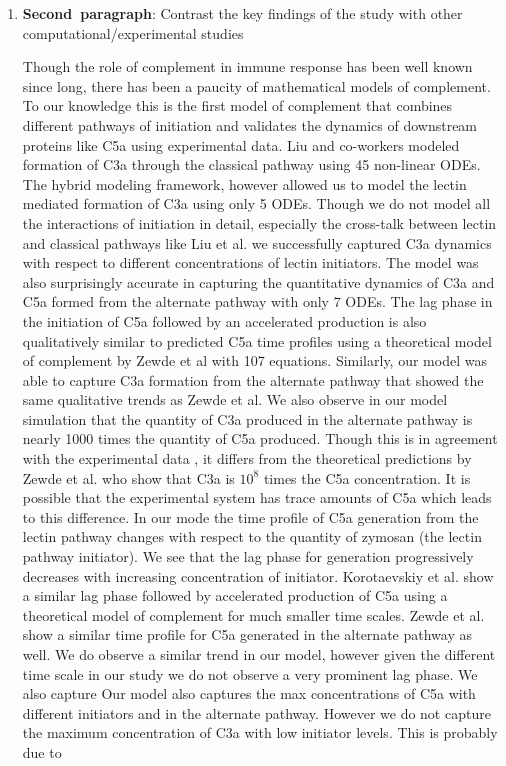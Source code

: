 \documentclass[12pt]{article}
\begin{document}
\begin{enumerate}
	\item{\textbf{Second~paragraph}: Contrast the key findings of the study with other computational/experimental studies}
	
Though the role of complement in immune response has been well known since long, there has been a paucity of mathematical models of complement. To our knowledge this is the first model of complement that combines different pathways of initiation and validates the dynamics of downstream proteins like C5a using experimental data. Liu and co-workers modeled formation of C3a through the classical pathway using 45 non-linear ODEs. 
The hybrid modeling framework, however allowed us to model the lectin mediated formation of C3a using only 5 ODEs.  Though we do not model all the interactions of initiation in detail, especially the cross-talk between lectin and classical pathways like Liu et al. we successfully captured C3a dynamics with respect to different concentrations of lectin initiators. The model was also surprisingly accurate in capturing the quantitative dynamics of C3a and C5a formed from the alternate pathway with only 7 ODEs. The lag phase in the initiation of C5a followed by an accelerated production is also qualitatively similar to predicted C5a time profiles using a theoretical model of complement by Zewde et al with 107 equations. Similarly, our model was able to capture C3a formation from the alternate pathway that showed the same qualitative trends as Zewde et al. We also observe in our model simulation that the quantity of C3a produced in the alternate pathway is nearly 1000 times the quantity of  C5a produced. Though this is in agreement with the experimental data  \cite{morad2015time}, it differs from the theoretical predictions by Zewde et al. who show that C3a is ${10^8}$ times the C5a concentration. It is possible that the experimental system has trace amounts of C5a which leads to this difference. In our mode the time profile of C5a generation from the lectin pathway changes with respect to the quantity of zymosan (the lectin pathway initiator). We see that the lag phase for generation progressively decreases with increasing concentration of initiator. Korotaevskiy et al. show a similar lag phase followed by accelerated production of C5a using a theoretical model of complement for much smaller time scales. Zewde et al. show a similar time profile for C5a generated in the alternate pathway as well. We do observe a similar trend in our model, however given the different time scale in our study we do not observe a very prominent lag phase. We also capture 
Our model also captures the max concentrations of C5a with different initiators and in the alternate pathway. However we do not capture the maximum concentration of C3a with low initiator levels. This is probably due to 


\end{enumerate}
\end{document}

